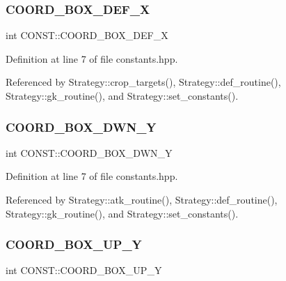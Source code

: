 \subsubsection{\texorpdfstring{C\+O\+O\+R\+D\+\_\+\+B\+O\+X\+\_\+\+D\+E\+F\+\_\+X}{COORD\_BOX\_DEF\_X}}
{\footnotesize\ttfamily int C\+O\+N\+S\+T\+::\+C\+O\+O\+R\+D\+\_\+\+B\+O\+X\+\_\+\+D\+E\+F\+\_\+X\hspace{0.3cm}{\ttfamily [static]}}



Definition at line 7 of file constants.\+hpp.



Referenced by Strategy\+::crop\+\_\+targets(), Strategy\+::def\+\_\+routine(), Strategy\+::gk\+\_\+routine(), and Strategy\+::set\+\_\+constants().

\mbox{\label{namespace_c_o_n_s_t_ae8aee80eeed2ae4a828ac666631db4d3}} 
\subsubsection{\texorpdfstring{C\+O\+O\+R\+D\+\_\+\+B\+O\+X\+\_\+\+D\+W\+N\+\_\+Y}{COORD\_BOX\_DWN\_Y}}
{\footnotesize\ttfamily int C\+O\+N\+S\+T\+::\+C\+O\+O\+R\+D\+\_\+\+B\+O\+X\+\_\+\+D\+W\+N\+\_\+Y\hspace{0.3cm}{\ttfamily [static]}}



Definition at line 7 of file constants.\+hpp.



Referenced by Strategy\+::atk\+\_\+routine(), Strategy\+::def\+\_\+routine(), Strategy\+::gk\+\_\+routine(), and Strategy\+::set\+\_\+constants().

\mbox{\label{namespace_c_o_n_s_t_a5183cf5159cdc31e5b55d6d97d0854e4}} 
\subsubsection{\texorpdfstring{C\+O\+O\+R\+D\+\_\+\+B\+O\+X\+\_\+\+U\+P\+\_\+Y}{COORD\_BOX\_UP\_Y}}
{\footnotesize\ttfamily int C\+O\+N\+S\+T\+::\+C\+O\+O\+R\+D\+\_\+\+B\+O\+X\+\_\+\+U\+P\+\_\+Y\hspace{0.3cm}{\ttfamily [static]}}



